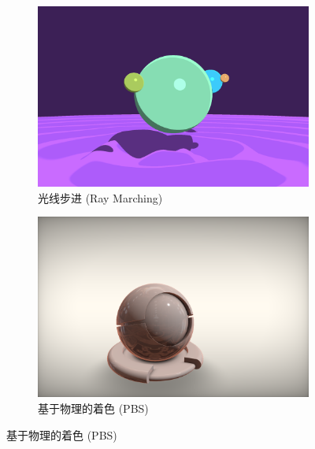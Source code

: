 {\begin{figure}[htbp]
  
  \begin{minipage}[b]{\textwidth}
      \begin{subfigure}[b]{0.48\textwidth}
          \includegraphics[width=\textwidth]{figures/shadertoy_raymarching.png}
          \caption{光线步进 (Ray Marching)}
          \label{fig:sub_raymarching}
      \end{subfigure}
      \hfill %
      \begin{subfigure}[b]{0.48\textwidth}
          \includegraphics[width=\textwidth]{figures/shadertoy_pbr.png}
          \caption{基于物理的着色 (PBS)}
          \label{fig:sub_pbs}
      \end{subfigure}
  \end{minipage}
  

\end{figure}}

